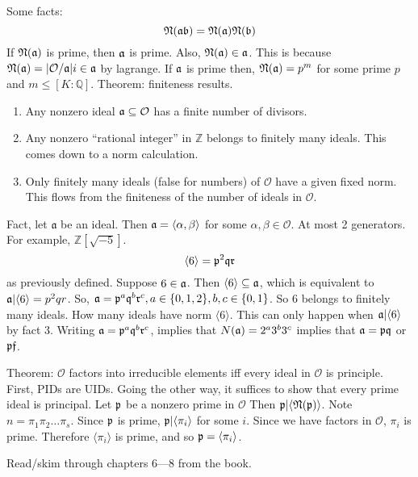 \documentclass{article}
\begin{document}
Some facts:
\[ \frak{N}(\frak{a}\frak{b}) = \frak{N}(\frak{a})\frak{N}(\frak{b}) \]
If $\frak{N}(\frak{a})$ is prime, then $\frak{a}$ is prime. 
Also, $\frak{N}(\frak{a}) \in \frak{a}$. This is because $\frak{N}(\frak{a}) =
|\mathcal{O}/\frak{a}|i \in \frak{a} $ by lagrange.
If $\frak{a}$ is prime then, $\frak{N}(\frak{a}) = p^m$ for some prime $p$ and
$m \leq [K:\mathbb{Q}]$. Theorem: finiteness results. 
\begin{enumerate}
\item Any nonzero ideal $\frak{a} \subseteq \mathcal{O}$ has a finite number of
divisors. 
\item Any nonzero ``rational integer'' in $\mathbb{Z}$ belongs to finitely many
ideals. This comes down to a norm calculation. 
\item Only finitely many ideals (false for numbers) of $\mathcal{O}$ have a
given fixed norm. This flows from the finiteness of the number of ideals in
$\mathcal{O}$. 
\end{enumerate}
Fact, let $\mathfrak{a}$ be an ideal. Then $\frak{a} = \langle \alpha, \beta
\rangle $ for some $\alpha, \beta \in \mathcal{O}$. At most 2 generators. For
example, $\mathbb{Z}[\sqrt{-5}]$. 
\[ \langle 6 \rangle = \frak{p}^2 \frak{q} \frak{r} \] as previously defined. 
Suppose $6 \in \frak{a}$. Then $\langle 6 \rangle \subseteq \frak{a}$, which is
equivalent to $\frak{a} | \langle 6 \rangle = p^2 q r $. 
So, $\frak{a} = \frak{p}^a \frak{q}^b \frak{r}^c, a\in \{0,1,2\}, b,c\in
\{0,1\}$. So 6 belongs to finitely many ideals. How many ideals have norm
$\langle 6 \rangle$. This can only happen when $\frak{a} | \langle 6 \rangle$ by
fact 3. Writing $\frak{a} = \frak{p}^a\frak{q}^b\frak{r}^c$, implies that
$N(\frak{a}) = 2^a 3^b3^c$ implies that $\frak{a} = \frak{pq}$ or $\frak{pf}$. 

Theorem: $\mathcal{O}$ factors into irreducible elements iff every ideal in
$\mathcal{O}$ is principle. First, PIDs are UIDs. Going the other way, it
suffices to show that every prime ideal is principal. Let $\frak{p}$ be a
nonzero prime in $\mathcal{O}$ Then $\frak{p} |
\langle\frak{N}(\frak{p})\rangle$. Note $n = \pi_1 \pi_2 \ldots \pi_s$. Since
$\frak{p}$ is prime, $\frak{p} | \langle \pi_i\rangle$ for some $i$. Since we
have factors in $\mathcal{O}$, $\pi_i$ is prime. Therefore $\langle
\pi_i\rangle$ is prime, and so $\frak{p} = \langle \pi_i\rangle$. 

Read/skim through chapters 6---8 from the book. 
\end{document}
